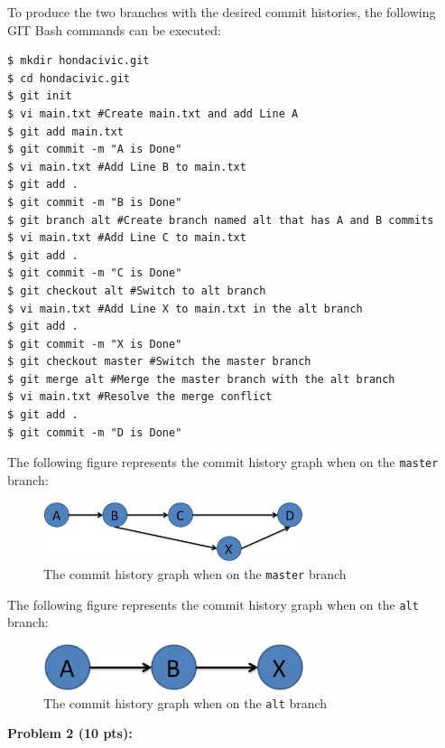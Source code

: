 \documentclass[12pt]{article}
\begin{document}
\noindent To produce the two branches with the desired commit histories, the following GIT Bash commands can be executed:
\begin{lstlisting}
$ mkdir hondacivic.git
$ cd hondacivic.git
$ git init
$ vi main.txt #Create main.txt and add Line A
$ git add main.txt
$ git commit -m "A is Done"
$ vi main.txt #Add Line B to main.txt
$ git add .
$ git commit -m "B is Done"
$ git branch alt #Create branch named alt that has A and B commits
$ vi main.txt #Add Line C to main.txt
$ git add .
$ git commit -m "C is Done"
$ git checkout alt #Switch to alt branch
$ vi main.txt #Add Line X to main.txt in the alt branch
$ git add .
$ git commit -m "X is Done"
$ git checkout master #Switch the master branch
$ git merge alt #Merge the master branch with the alt branch
$ vi main.txt #Resolve the merge conflict
$ git add .
$ git commit -m "D is Done"
\end{lstlisting}  

\noindent The following figure represents the commit history graph when on the \texttt{master} branch:

\begin{figure}[h!]
\begin{center}
\includegraphics[width=3in]{Master.png}
\end{center}
\caption{The commit history graph when on the \texttt{master} branch}
\end{figure}

\noindent The following figure represents the commit history graph when on the \texttt{alt} branch:

\begin{figure}[h!]
\begin{center}
\includegraphics[width=3in]{Alt.png}
\end{center}
\caption{The commit history graph when on the \texttt{alt} branch}
\end{figure}

\newpage
\noindent\textbf{Problem 2 (10 pts):}
\end{document}

